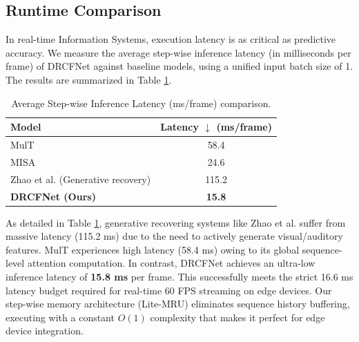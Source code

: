 \documentclass[sn-mathphys,Numbered]{sn-jnl}
\theoremstyle{thmstyleone}
\theoremstyle{thmstyletwo}
\theoremstyle{thmstylethree}
\begin{document}
\subsection{Runtime Comparison}\label{subsec:runtime}
In real-time Information Systems, execution latency is as critical as predictive accuracy. We measure the average step-wise inference latency (in milliseconds per frame) of DRCFNet against baseline models, using a unified input batch size of 1. The results are summarized in Table \ref{tab:runtime}.
\begin{table}[htbp]
\centering
\caption{Average Step-wise Inference Latency (ms/frame) comparison.}
\label{tab:runtime}
\begin{tabular}{lc}
\toprule
\textbf{Model} & \textbf{Latency $\downarrow$ (ms/frame)} \\
\midrule
MulT \cite{tsai2019multimodal} & 58.4 \\
\midrule
MISA \cite{hazarika2020misa} & 24.6 \\
\midrule
Zhao et al. \cite{zhao2023missing} (Generative recovery) & 115.2 \\
\midrule
\textbf{DRCFNet (Ours)} & \textbf{15.8} \\
\bottomrule
\end{tabular}
\end{table}
As detailed in Table \ref{tab:runtime}, generative recovering systems like Zhao et al. \cite{zhao2023missing} suffer from massive latency (115.2 ms) due to the need to actively generate visual/auditory features. MulT experiences high latency (58.4 ms) owing to its global sequence-level attention computation. In contrast, DRCFNet achieves an ultra-low inference latency of \textbf{15.8 ms} per frame. This successfully meets the strict 16.6 ms latency budget required for real-time 60 FPS streaming on edge devices. Our step-wise memory architecture (Lite-MRU) eliminates sequence history buffering, executing with a constant $O(1)$ complexity that makes it perfect for edge device integration.
\end{document}
